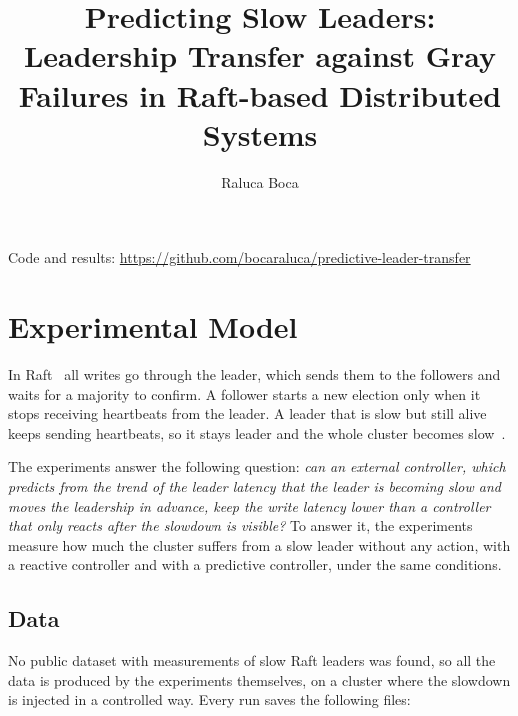 \documentclass[11pt,a4paper]{article}
\title{Predicting Slow Leaders: Leadership Transfer against Gray Failures in Raft-based Distributed Systems}
\author{Raluca Boca}
\date{}
\begin{document}
\maketitle

\noindent Code and results: \url{https://github.com/bocaraluca/predictive-leader-transfer}

\section{Experimental Model}

In Raft~\cite{raft} all writes go through the leader, which sends them to the followers and waits for a majority to confirm. A follower starts a new election only when it stops receiving heartbeats from the leader. A leader that is slow but still alive keeps sending heartbeats, so it stays leader and the whole cluster becomes slow~\cite{grayfailure,onesize}.

The experiments answer the following question: \emph{can an external controller, which predicts from the trend of the leader latency that the leader is becoming slow and moves the leadership in advance, keep the write latency lower than a controller that only reacts after the slowdown is visible?} To answer it, the experiments measure how much the cluster suffers from a slow leader without any action, with a reactive controller and with a predictive controller, under the same conditions.

\subsection{Data}

No public dataset with measurements of slow Raft leaders was found, so all the data is produced by the experiments themselves, on a cluster where the slowdown is injected in a controlled way. Every run saves the following files:
\end{document}
